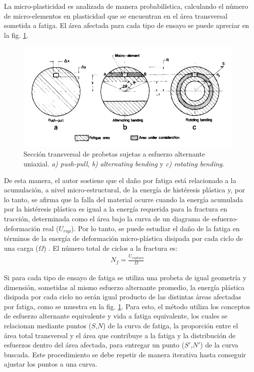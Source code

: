 La micro-plasticidad es analizada de manera probabilística, calculando el número de micro-elementos en plasticidad que se encuentran en el área transversal sometida a fatiga. El área afectada para cada tipo de ensayo se puede apreciar en la fig. \ref{fig:affar_fat}.

\begin{figure}[h]
\centering
\includegraphics[scale=1]{Imagenes/affectedarea_fatigue.pdf}
\caption{Sección transversal de probetas sujetas a esfuerzo alternante uniaxial. \textit{a) push-pull}, \textit{b) alternating bending} y \textit{c) rotating bending}. \cite{esin1980method}}
\label{fig:affar_fat}
\end{figure}

De esta manera, el autor sostiene que el daño por fatiga está relacionado a la acumulación, a nivel micro-estructural, de la energía de histéresis plástica y, por lo tanto, se afirma que la falla del material ocurre cuando la energía acumulada por la histéresis plástica es igual a la energía requerida para la fractura en tracción, determinada como el área bajo la curva de un diagrama de esfuerzo-deformación real ($U_{rup}$). Por lo tanto, se puede estudiar el daño de la fatiga en términos de la energía de deformación micro-plástica disipada por cada ciclo de una carga ($\Omega$) \cite{esin1967stress}. El número total de ciclos a la fractura es:
\begin{gather}
	N_f = \frac{U_{ruptura}}{\Omega}
\end{gather} 

Si para cada tipo de ensayo de fatiga se utiliza una probeta de igual geometría y dimensión, sometidas al mismo esfuerzo alternante promedio, la energía plástica disipada por cada ciclo no serán igual producto de las distintas áreas afectadas por fatiga, como se muestra en la fig. \ref{fig:affar_fat}. Para esto, el método utiliza los conceptos de esfuerzo alternante equivalente y vida a fatiga equivalente, los cuales se relacionan mediante puntos ($S$,$N$) de la curva de fatiga, la proporción entre el área total transversal y el área que contribuye a la fatiga y la distribución de esfuerzos dentro del área afectada, para entregar un punto ($S'$,$N'$) de la curva buscada. Este procedimiento se debe repetir de manera iterativa hasta conseguir ajustar los puntos a una curva.

